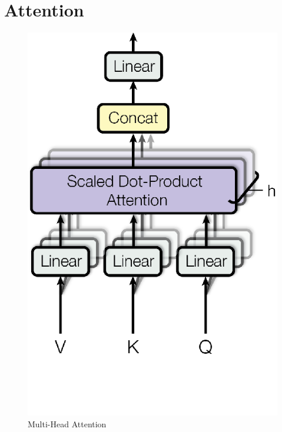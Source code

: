 \documentclass[conference]{IEEEtran}
\begin{document}
\section{Attention}

\begin{figure}[htbp]
\centerline{\includegraphics{img/multi_head_attention.png}}
\caption{Multi-Head Attention \cite{attention_is_all_you_need}}
\label{fig}
\end{figure}
\end{document}
